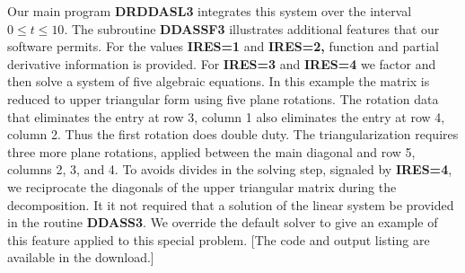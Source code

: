 \documentclass[twoside]{MATH77}
\begin{document}
Our main program \textbf{DRDDASL3} integrates this system over the
interval $0\leq t\leq10$.  The subroutine \textbf{DDASSF3} illustrates
additional features that our software permits.  For the values
\textbf{IRES=1} and \textbf{IRES=2,} function and partial derivative
information is provided.  For \textbf{IRES=3} and \textbf{IRES=4} we
factor and then solve a system of five algebraic equations.  In this
example the matrix is reduced to upper triangular form using five
plane rotations.  The rotation data that eliminates the entry at row
3, column 1 also eliminates the entry at row 4, column 2.  Thus the
first rotation does double duty.  The triangularization requires three
more plane rotations, applied between the main diagonal and row 5,
columns 2, 3, and 4.  To avoids divides in the solving step, signaled
by \textbf{IRES=4}, we reciprocate the diagonals of the upper
triangular matrix during the decomposition.  It it not required that a
solution of the linear system be provided in the routine
\textbf{DDASS3}.  We override the default solver to give an example of
this feature applied to this special problem.  [The code and output
listing are available in the download.]
\end{document}
